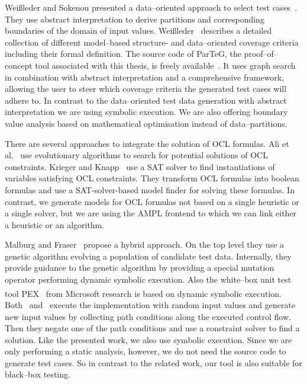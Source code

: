 \documentclass[runningheads,a4paper]{llncs}%
\begin{document}
Wei{\ss}leder and Sokenou presented a data--oriented approach to select test
cases~\cite{weissleder2008automatic}. They use abstract interpretation to derive
partitions and corresponding boundaries of the domain of input values.
Wei{\ss}leder~\cite{ParTeG} describes a detailed collection of different
model--based structure- and data--oriented coverage criteria including their
formal definition.
The source code of ParTeG, the proof--of--concept tool associated with this
thesis, is freely available~\cite{PartegWebsite}. It uses graph search in
combination with abstract interpretation and a comprehensive framework, allowing
the user to steer which coverage criteria the generated test cases will adhere
to. In contrast to the data--oriented test data generation with abstract
interpretation we are using symbolic execution. We are also offering boundary
value analysis based on mathematical optimisation instead of data--partitions.

There are several approaches to integrate the solution of OCL formulas. Ali et
al.~\cite{ali2011search} use evolutionary algorithms to search for potential
solutions of OCL constraints. Krieger and
Knapp~\cite{krieger2008executingUnderspecifiedOCL} use a SAT solver to find
instantiations of variables satisfying OCL constraints. They transform OCL
formulas into boolean formulas and use a SAT-solver-based model finder for
solving these formulas. In contrast, we generate models for OCL formulas not
based on a single heuristic or a single solver, but we are using the AMPL
frontend to which we can link either a heuristic or an algorithm.

Malburg and Fraser~\cite{malburg2011combining} propose a hybrid approach. On the
top level they use a genetic algorithm evolving a population of candidate test
data. Internally, they provide guidance to the genetic algorithm by providing a
special mutation operator performing dynamic symbolic execution. Also the
white--box unit test tool PEX~\cite{pex} from
Microsoft\textsuperscript{\textregistered} research is based on dynamic symbolic
execution. Both~\cite{malburg2011combining} and~\cite{pex} execute the
implementation with random input values and generate new input values by
collecting path conditions along the executed control flow. Then they negate one
of the path conditions and use a constraint solver to find a solution. Like the
presented work, we also use symbolic execution. Since we are only performing a
static analysis, however, we do not need the source code to generate test cases.
So in contrast to the related work, our tool is also suitable for black--box
testing.
%
\end{document}
